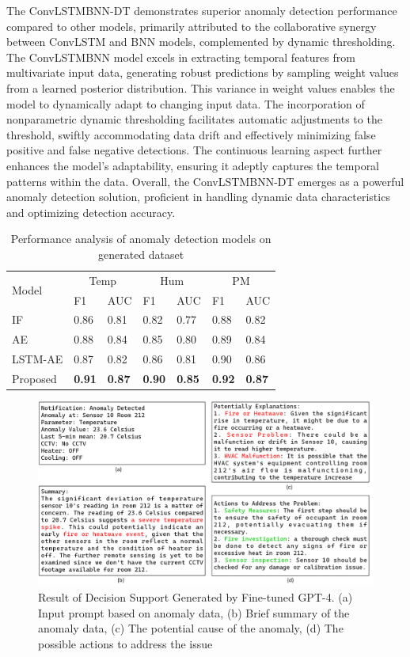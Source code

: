 \documentclass[final,3p,times,twocolumn]{elsarticle}
\begin{document}
The ConvLSTMBNN-DT demonstrates superior anomaly detection performance compared to other models, primarily attributed to the collaborative synergy between ConvLSTM and BNN models, complemented by dynamic thresholding. The ConvLSTMBNN model excels in extracting temporal features from multivariate input data, generating robust predictions by sampling weight values from a learned posterior distribution. This variance in weight values enables the model to dynamically adapt to changing input data. The incorporation of nonparametric dynamic thresholding facilitates automatic adjustments to the threshold, swiftly accommodating data drift and effectively minimizing false positive and false negative detections. The continuous learning aspect further enhances the model's adaptability, ensuring it adeptly captures the temporal patterns within the data. Overall, the ConvLSTMBNN-DT emerges as a powerful anomaly detection solution, proficient in handling dynamic data characteristics and optimizing detection accuracy.

\begin{table}[]
\caption{Performance analysis of anomaly detection models on generated dataset}
\begin{tabular}{lllllll}
\toprule
\multirow{2}{*}{Model} & \multicolumn{2}{c}{Temp} & \multicolumn{2}{c}{Hum}  & \multicolumn{2}{c}{PM} \\ \cline{2-7}
			 &F1                & AUC               & F1              &  AUC            &  F1		&AUC  \\ \hline
IF & 0.86  & 0.81  & 0.82 & 0.77 & 0.88 & 0.82\\
AE      & 0.88 & 0.84 & 0.85 & 0.80 & 0.89  & 0.84\\
LSTM-AE          & 0.87 & 0.82 & 0.86 & 0.81 & 0.90 & 0.86\\ 
Proposed          &\textbf{0.91}& \textbf{0.87} &\textbf{0.90}&\textbf{0.85}&\textbf{0.92}&\textbf{0.87}\\ \hline
\end{tabular}
\end{table}

\begin{figure}[t]
	\centering
	\includegraphics[width=13cm]{NLP} 
	\caption{Result of Decision Support Generated by Fine-tuned GPT-4. (a) Input prompt based on anomaly data, (b) Brief summary of the anomaly data, (c) The potential cause of the anomaly, (d) The possible actions to address the issue}\label{fig:NLP}
\end{figure}
\end{document}

